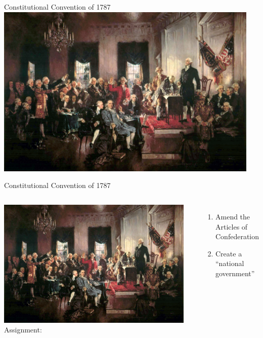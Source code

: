 \begin{frame}{Constitutional Convention of 1787}
    \centering
    \includegraphics[width=0.95\textwidth]{img/constitutional-convention.jpg} \\
\end{frame}

\begin{frame}{Constitutional Convention of 1787}
    \begin{columns}[onlytextwidth]
            \centering
            \includegraphics[width=0.95\textwidth]{img/constitutional-convention.jpg} \\

            Assignment:
            \begin{enumerate}
                \item Amend the Articles of Confederation
                \item Create a “national government”
            \end{enumerate}
    \end{columns}
\end{frame}

